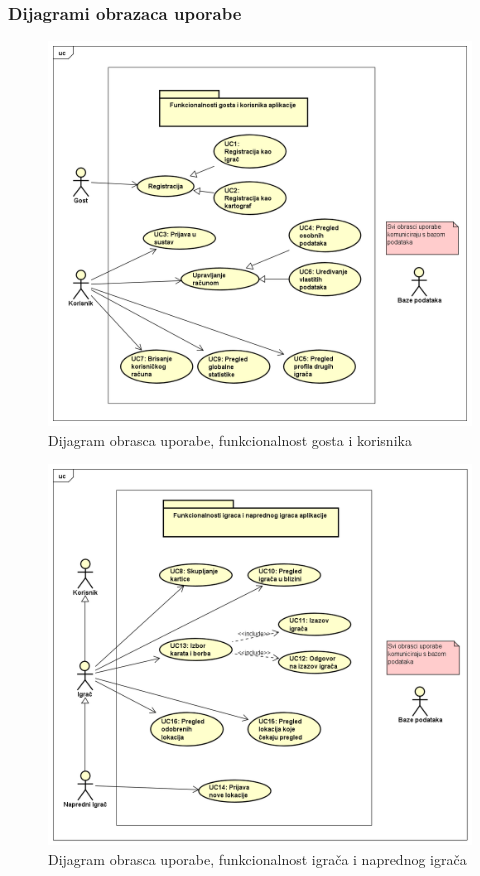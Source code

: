 					
				\subsubsection{Dijagrami obrazaca uporabe}
				
				\begin{figure}[H]
        			\includegraphics[scale=0.5]{slike/UCDiagrami/korisnik.png} %
        			\centering
        			\caption{Dijagram obrasca uporabe, funkcionalnost gosta i korisnika}
        			\label{fig:promjene}
        		\end{figure}
					
				\begin{figure}[H]
        			\includegraphics[scale=0.5]{slike/UCDiagrami/igrac.png} %
        			\centering
        			\caption{Dijagram obrasca uporabe, funkcionalnost igrača i naprednog igrača}
        			\label{fig:promjene}
        		\end{figure}
					
